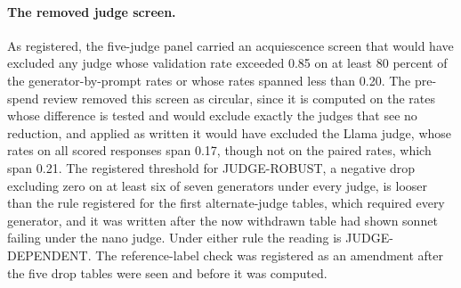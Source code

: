 \paragraph{The removed judge screen.}
As registered, the five-judge panel carried an acquiescence screen that
would have excluded any judge whose validation rate
exceeded 0.85 on at least 80 percent of the generator-by-prompt rates or whose
rates spanned less than 0.20. The pre-spend review removed this screen as
circular, since it is computed on the rates whose difference is tested and
would exclude exactly the judges that see no reduction, and applied as written
it would have excluded the Llama judge, whose rates on all scored responses
span 0.17, though not on the paired rates, which span 0.21.
The registered threshold for JUDGE-ROBUST, a negative drop excluding zero on
at least six of seven generators under every judge, is looser than the rule
registered for the first alternate-judge tables, which required every
generator, and it was written after the now withdrawn table had shown sonnet
failing under the nano judge. Under either
rule the reading is JUDGE-DEPENDENT. The reference-label check was registered
as an amendment after the five drop tables were seen and before it was
computed.


